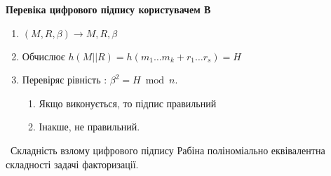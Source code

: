 \begin{center}
\textbf{Перевіка цифрового підпису користувачем В}
\end{center}

\begin{enumerate}
        \item   $(M,R,\beta) \rightarrow M,R,\beta$
        \item Обчислює  $h(M||R)=h(m_1…m_k+r_1…r_s)=H$
        \item Перевіряє рівність : $\beta^2 = H \bmod n$.
        \begin{enumerate}
                \item Якщо виконується, то підпис правильний
                \item Інакше, не правильний.
        \end{enumerate} 
\end{enumerate}
\ Складність взлому цифрового підпису Рабіна поліноміально еквівалентна складності задачі факторизації.